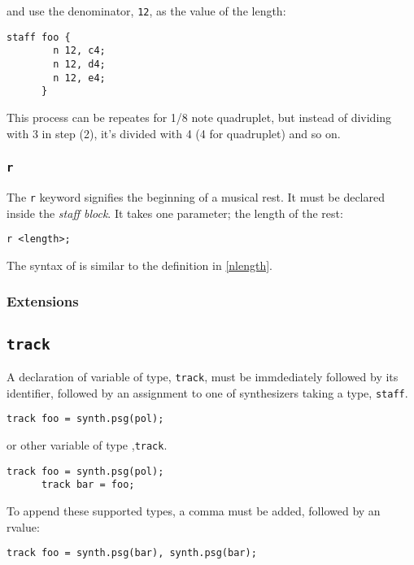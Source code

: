 and use the denominator, \verb+12+, as the value of the length:
\begin{Verbatim}[frame=single]
      staff foo {
        n 12, c4;
        n 12, d4;
        n 12, e4;
      }
\end{Verbatim}

This process can be repeates for 1/8 note quadruplet, but instead of dividing
with 3 in step (2), it's divided with 4 (4 for quadruplet) and so on.


\subsubsection{\texttt{r}}

\np The \verb+r+ keyword signifies the beginning of a musical rest. It must be
declared inside the \textit{staff block}. It takes one parameter; the
length of the rest:

\begin{Verbatim}[frame=single]
      r <length>;
\end{Verbatim}

\np The syntax of  is similar to the definition in 
\autoref{nlength}.

\subsubsection{Extensions}

\subsection{\texttt{track}}
\np A declaration of variable of type,
\verb+track+, must be immdediately followed by its identifier, followed by
an assignment to one of synthesizers taking a type, \verb+staff+. 
\begin{Verbatim}[frame=single]
       track foo = synth.psg(pol);
\end{Verbatim}

or other variable of type ,\verb+track+.
\begin{Verbatim}[frame=single]
      track foo = synth.psg(pol);
      track bar = foo;
\end{Verbatim}

\np To append these supported types, a comma must be added, followed by an rvalue:
\begin{Verbatim}[frame=single]
      track foo = synth.psg(bar), synth.psg(bar);
\end{Verbatim}


